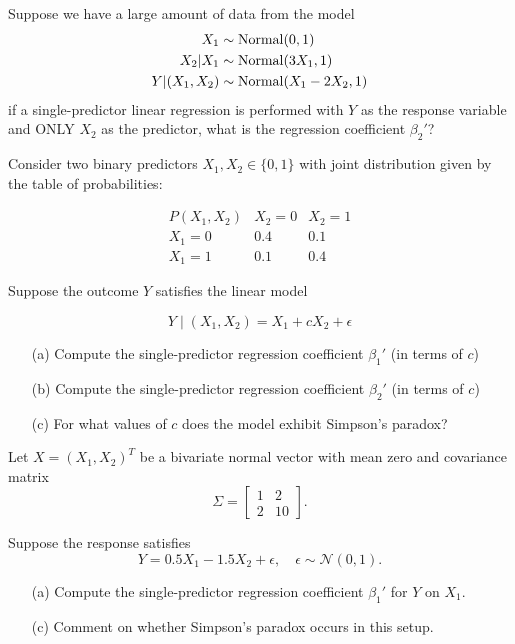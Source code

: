\begin{exercise}[\ding{111}]
Suppose we have a large amount of data from the model 
\begin{align}
X_1 &\sim  {\rm Normal}(0,1)\\
X_2|X_1 &\sim {\rm Normal}(3X_1,1)\\
Y|(X_1,X_2) &\sim {\rm Normal}(X_1 -2 X_2,1)
\end{align}
if a single-predictor linear regression is performed with $Y$ as the response variable and ONLY $X_2$ as the predictor, what is the regression coefficient $\beta_2'$? 

\end{exercise}


\begin{exercise}[\ding{111}]
Consider two binary predictors \(X_1, X_2 \in \{0,1\}\) with joint distribution given by the table of probabilities:

\[
\begin{array}{c|cc}
P(X_1, X_2) & X_2=0 & X_2=1 \\ \hline
X_1=0 & 0.4 & 0.1 \\
X_1=1 & 0.1 & 0.4
\end{array}
\]

Suppose the outcome \(Y\) satisfies the linear model

\[
Y \mid (X_1, X_2) = X_1 + c X_2 + \epsilon 
\]


\begin{itemize}
\item[(a)] Compute the single-predictor regression coefficient $\beta_1'$ (in terms of $c$)
\item[(b)] Compute the single-predictor regression coefficient $\beta_2'$ (in terms of $c$)
\item[(c)] For what values of $c$ does the model exhibit Simpson's paradox? 
\end{itemize}
\end{exercise}


\begin{exercise}[\ding{111}]
Let \(X = (X_1, X_2)^T\) be a bivariate normal vector with mean zero and covariance matrix
\[
\Sigma = \begin{bmatrix} 1 & 2 \\ 2 & 10 \end{bmatrix}.
\]

Suppose the response satisfies
\[
Y = 0.5 X_1 - 1.5 X_2 + \epsilon, \quad \epsilon \sim \mathcal{N}(0,1).
\]

\begin{itemize}
\item[(a)] Compute the single-predictor regression coefficient \(\beta_1'\) for \(Y\) on \(X_1\).
\item[(c)] Comment on whether Simpson’s paradox occurs in this setup.
\end{itemize}
\end{exercise}


